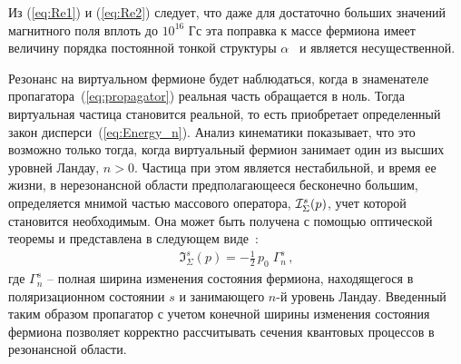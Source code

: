 Из (\ref{eq:Re1}) и (\ref{eq:Re2}) следует, что даже для достаточно больших значений магнитного поля вплоть до $10^{16}$ Гс эта поправка к массе фермиона имеет величину порядка постоянной тонкой структуры $\alpha$~\cite{Kuznetsov:2003,Sokolov:1986} и является несущественной.
 
Резонанс на виртуальном фермионе будет наблюдаться, когда в знаменателе пропагатора~(\ref{eq:propagator}) реальная часть обращается в ноль. Тогда виртуальная частица становится реальной, то есть приобретает определенный закон дисперси~(\ref{eq:Energy_n}). Анализ кинематики показывает, что это возможно только тогда, когда виртуальный фермион занимает один из высших уровней Ландау, $n > 0$. Частица при этом является нестабильной, и время ее жизни, в нерезонансной области предполагающееся бесконечно большим, определяется мнимой частью массового оператора,  ${\cal I}^{s}_\Sigma (p)$, учет которой становится необходимым. Она может быть получена с помощью оптической теоремы и представлена в следующем виде~\cite{Weldon:1982, Zhukovski:1994}:
%
\begin{eqnarray}
\Im^{s}_\Sigma (p) = - \frac{1}{2}\, p_0 \; \Gamma_n^{s} \, ,
\label{eq:I_Sigma}
\end{eqnarray}
\noindent где $\Gamma_n^{s}$ -- полная ширина изменения состояния фермиона, 
находящегося 
в поляризационном состоянии $s$ и занимающего  $n$-й уровень Ландау.  Введенный 
таким образом пропагатор с учетом конечной ширины изменения состояния фермиона  
позволяет корректно рассчитывать сечения квантовых процессов в резонансной 
области.